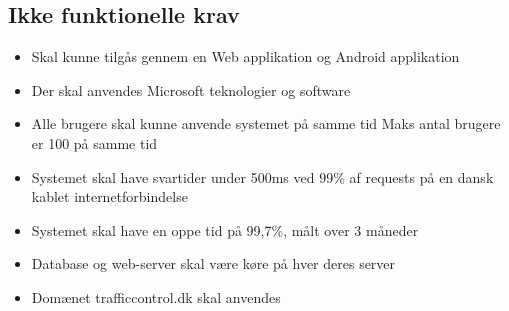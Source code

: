 \hspace{1em}
\subsection{Ikke funktionelle krav}
\begin{itemize}[-]
	\itemsep 0.3em 
	\item Skal kunne tilgås gennem en Web applikation og Android applikation
	\item Der skal anvendes Microsoft teknologier og software
	\item Alle brugere skal kunne anvende systemet på samme tid Maks antal brugere er 100 på samme tid
	\item Systemet skal have svartider under 500ms ved 99\% af requests på en dansk kablet internetforbindelse
	\item Systemet skal have en oppe tid på 99,7\%, målt over 3 måneder
	\item Database og web-server skal være køre på hver deres server
	\item Domænet trafficcontrol.dk skal anvendes 
\end{itemize}

\hspace{1em}

\newpage

